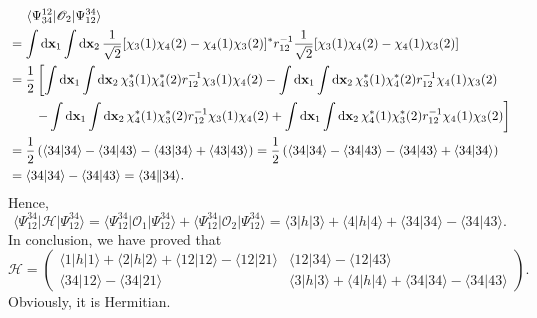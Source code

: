 \documentclass[a4paper]{book}
\newcommand\lr[2]{\langle#1\|#2\rangle}
\newcommand*{\dif}{\mathop{}\!\mathrm{d}}
\newcommand{\bfx}{{\bf x}}
\begin{document}
\begin{solution}
	\begin{align*}
		&\hspace{1.4em}\langle \Psi^{12}_{34} | \mathscr{O}_2 | \Psi_{12}^{34} \rangle \\
		&=  \int \dif \bfx_1 \int \dif \bfx_2 \, \frac{1}{\sqrt{2}}[ \chi_3(1) \chi_4(2) - \chi_4(1) \chi_3(2) ]^* r^{-1}_{12} \frac{1}{\sqrt{2}}[ \chi_3(1) \chi_4(2) - \chi_4(1) \chi_3(2) ] \\
		&= \frac{1}{2} \left[ \int \dif \bfx_1 \int \dif \bfx_2 \,\chi_3^*(1) \chi^*_4(2) r^{-1}_{12} \chi_3(1) \chi_4(2) - \int \dif \bfx_1 \int \dif \bfx_2 \, \chi_3^*(1) \chi^*_4(2) r^{-1}_{12} \chi_4(1) \chi_3(2) \right. \\
		&\hspace{2em} \left. -\int \dif \bfx_1 \int \dif \bfx_2 \,\chi_4^*(1) \chi^*_3(2) r^{-1}_{12} \chi_3(1) \chi_4(2) + \int \dif \bfx_1 \int \dif \bfx_2 \, \chi_4^*(1) \chi^*_3(2) r^{-1}_{12} \chi_4(1) \chi_3(2) \right] \\
		&= \frac{1}{2} \left( \langle 34 | 34 \rangle - \langle 34 |  43 \rangle - \langle 43 | 34 \rangle + \langle 43 | 43 \rangle \right) = \frac{1}{2} \left( \langle 34 | 34 \rangle - \langle 34 |  43 \rangle - \langle 34 | 43 \rangle + \langle 34 | 34 \rangle \right) \\
		&= \langle 34 | 34 \rangle - \langle 34 | 43 \rangle = \lr{34}{34}.
	\end{align*}
	Hence,
	\begin{equation}
		\langle \Psi^{34}_{12} | \mathscr{H} | \Psi^{34}_{12} \rangle = \langle \Psi^{34}_{12} | \mathscr{O}_1 | \Psi^{34}_{12} \rangle + \langle \Psi^{34}_{12} | \mathscr{O}_2 | \Psi^{34}_{12} \rangle = \langle 3 | h | 3 \rangle + \langle 4 | h | 4 \rangle + \langle 34 | 34 \rangle - \langle 34 |  43 \rangle.
	\end{equation}
	In conclusion, we have proved that
	\begin{equation}
		\mathscr{H} = \begin{pmatrix}
			\langle 1 | h | 1 \rangle + \langle 2 | h | 2 \rangle + \langle 12 | 12 \rangle - \langle 12 | 21 \rangle & \langle 12 | 34 \rangle - \langle 12 | 43 \rangle \\
			\langle 34 | 12 \rangle - \langle 34 | 21 \rangle & \langle 3 | h | 3 \rangle + \langle 4 | h | 4 \rangle + \langle 34| 34 \rangle - \langle 34 | 43 \rangle
		\end{pmatrix}.
	\end{equation}
	Obviously, it is Hermitian.
	\end{solution}
	
\end{document}
